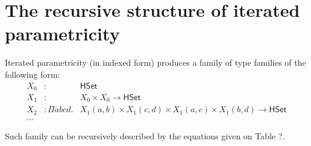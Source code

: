\documentclass{article}
\newcommand{\U}{\ensuremath{\mathsf{{HSet}}}}
\begin{document}
\section{The recursive structure of iterated parametricity}
Iterated parametricity (in indexed form) produces a family of type
families of the following form:
\begin{equation*}
  \begin{array}{llr}
    X_0 & :              & \U                                                                        \\
    X_1 & :              & X_0 \times X_0 \rightarrow  \U                                            \\
    X_2 & : \Pi a b c d. & X_1(a,b) \times X_1 (c,d) \times X_1(a,c) \times X_1 (b,d) \rightarrow \U \\
    \ldots
  \end{array}
\end{equation*}

Such family can be recursively described by the equations given on Table ?.
\end{document}
